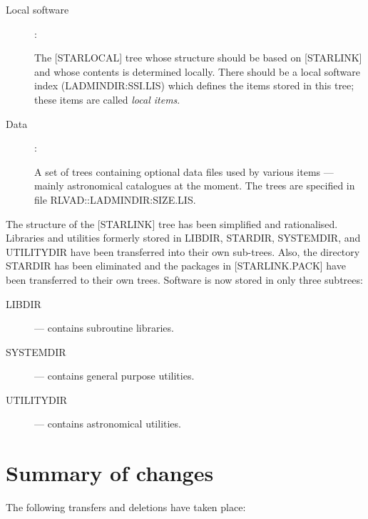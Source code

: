 \begin{description}
\item [Local software] :

 The [STARLOCAL] tree whose structure should be based on \mbox{[STARLINK]} and
 whose contents is determined locally.
 There should be a local software index (LADMINDIR:SSI.LIS) which defines the
 items stored in this tree; these items are called {\em local items}.

\item [Data] :

 A set of trees containing optional data files used by various items --- mainly
 astronomical catalogues at the moment.
 The trees are specified in file RLVAD::LADMINDIR:SIZE.LIS.

\end{description}

The structure of the [STARLINK] tree has been simplified and rationalised.
Libraries and utilities formerly stored in LIBDIR, STARDIR, SYSTEMDIR, and
UTILITYDIR have been transferred into their own sub-trees.
Also, the directory STARDIR has been eliminated and the packages in
[STARLINK.PACK] have been transferred to their own trees.
Software is now stored in only three subtrees:
\begin{description}
\item [LIBDIR] --- contains subroutine libraries.
\item [SYSTEMDIR] --- contains general purpose utilities.
\item [UTILITYDIR] --- contains astronomical utilities.
\end{description}

\section{Summary of changes}

The following transfers and deletions have taken place:

